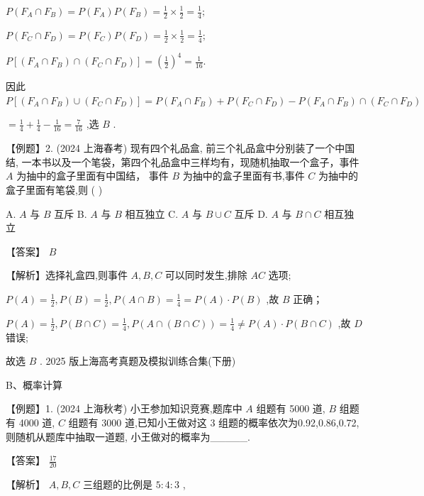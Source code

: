 \documentclass[10pt]{article}
\begin{document}
\(P\left( {{F}_{A} \cap  {F}_{B}}\right)  = P\left( {F}_{A}\right) P\left( {F}_{B}\right)  = \frac{1}{2} \times  \frac{1}{2} = \frac{1}{4};\)

\(P\left( {{F}_{C} \cap  {F}_{D}}\right)  = P\left( {F}_{C}\right) P\left( {F}_{D}\right)  = \frac{1}{2} \times  \frac{1}{2} = \frac{1}{4};\)

\(P\left\lbrack  {\left( {{F}_{A} \cap  {F}_{B}}\right)  \cap  \left( {{F}_{C} \cap  {F}_{D}}\right) }\right\rbrack   = {\left( \frac{1}{2}\right) }^{4} = \frac{1}{16}.\)

因此 \(P\left\lbrack  {\left( {{F}_{A} \cap  {F}_{B}}\right)  \cup  \left( {{F}_{C} \cap  {F}_{D}}\right) }\right\rbrack   = P\left( {{F}_{A} \cap  {F}_{B}}\right)  + P\left( {{F}_{C} \cap  {F}_{D}}\right)  - P\left( {{F}_{A} \cap  {F}_{B}}\right)  \cap  \left( {{F}_{C} \cap  {F}_{D}}\right)\)

\(= \frac{1}{4} + \frac{1}{4} - \frac{1}{16} = \frac{7}{16}\) ,选 \(B\) .

【例题】2. (2024 上海春考) 现有四个礼品盒, 前三个礼品盒中分别装了一个中国结, 一本书以及一个笔袋，第四个礼品盒中三样均有，现随机抽取一个盒子，事件 \(A\) 为抽中的盒子里面有中国结， 事件 \(B\) 为抽中的盒子里面有书,事件 \(C\) 为抽中的盒子里面有笔袋,则 ( )

A. \(A\) 与 \(B\) 互斥 B. \(A\) 与 \(B\) 相互独立 C. \(A\) 与 \(B \cup  C\) 互斥 D. \(A\) 与 \(B \cap  C\) 相互独立

【答案】 \(B\)

【解析】选择礼盒四,则事件 \(A,B,C\) 可以同时发生,排除 \({AC}\) 选项;

\(P\left( A\right)  = \frac{1}{2},P\left( B\right)  = \frac{1}{2},P\left( {A \cap  B}\right)  = \frac{1}{4} = P\left( A\right)  \cdot  P\left( B\right)\) ,故 \(B\) 正确；

\(P\left( A\right)  = \frac{1}{2},P\left( {B \cap  C}\right)  = \frac{1}{4},P\left( {A \cap  \left( {B \cap  C}\right) }\right)  = \frac{1}{4} \neq  P\left( A\right)  \cdot  P\left( {B \cap  C}\right)\) ,故 \(D\) 错误;

故选 \(B\) . 2025 版上海高考真题及模拟训练合集(下册)

B、概率计算

【例题】1. (2024 上海秋考) 小王参加知识竞赛,题库中 \(A\) 组题有 5000 道, \(B\) 组题有 4000 道, \(C\) 组题有 3000 道,已知小王做对这 3 组题的概率依次为0.92,0.86,0.72,则随机从题库中抽取一道题, 小王做对的概率为\_\_\_\_\_.

【答案】 \(\frac{17}{20}\)

【解析】 \(A,B,C\) 三组题的比例是 \(5 : 4 : 3\) ,
\end{document}
